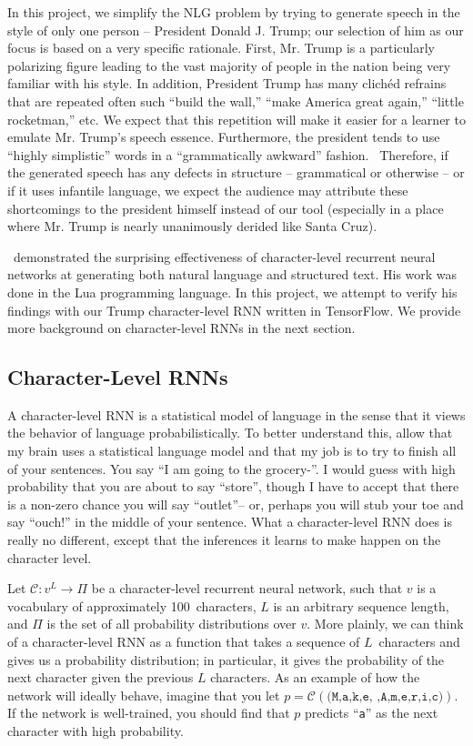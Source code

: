 \documentclass{article}
\begin{document}
In this project, we simplify the NLG problem by trying to generate speech in the style of only one person -- President Donald J. Trump; our selection of him as our focus is based on a very specific rationale.  First, Mr. Trump is a particularly polarizing figure leading to the vast majority of people in the nation being very familiar with his style.  In addition, President Trump has many clich\'ed refrains that are repeated often such ``build the wall,'' ``make America great again,'' ``little rocketman,'' etc. We expect that this repetition will make it easier for a learner to emulate Mr. Trump's speech essence.  Furthermore, the president tends to use ``highly simplistic'' words in a ``grammatically awkward'' fashion.~\cite{goldhill2017}  Therefore, if the generated speech has any defects in structure -- grammatical or otherwise -- or if it uses infantile language, we expect the audience may attribute these shortcomings to the president himself instead of our tool (especially in a place where Mr. Trump is nearly unanimously derided like Santa Cruz).

\cite{karapathy2015}~demonstrated the surprising effectiveness of character-level recurrent neural networks at generating both natural language and structured text. His work was done in the Lua programming language.  In this project, we attempt to verify his findings with our Trump character-level RNN written in TensorFlow.  We provide more background on character-level RNNs in the next section.


\subsection{Character-Level RNNs}

A character-level RNN is a statistical model of language in the sense that it views the behavior of language probabilistically. To better understand this, allow that my brain uses a statistical language model and that my job is to try to finish all of your sentences. You say ``I am going to the grocery-''. I would guess with high probability that you are about to say ``store'', though I have to accept that there is a non-zero chance you will say ``outlet''-- or, perhaps you will stub your toe and say ``ouch!'' in the middle of your sentence. What a character-level RNN does is really no different, except that the inferences it learns to make happen on the character level.

Let $\mathcal{C} : v^L \rightarrow \Pi$ be a character-level recurrent neural network, such that $v$ is a vocabulary of approximately 100~characters, $L$ is an arbitrary sequence length, and $\Pi$ is the set of all probability distributions over $v$. More plainly, we can think of a character-level RNN as a function that takes a sequence of $L$~characters and gives us a probability distribution; in particular, it gives the probability of the next character given the previous $L$ characters. As an example of how the network will ideally behave, imagine that you let $p = \mathcal{C}(\texttt{(M,a,k,e, ,A,m,e,r,i,c)})$. If the network is well-trained, you should find that $p$ predicts ``\texttt{a}'' as the next character with high probability.
\end{document}
